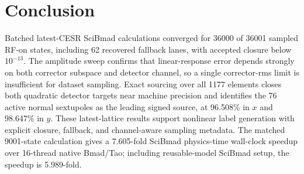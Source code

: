 \documentclass[letterpaper]{jacow}
\begin{document}
\section{Conclusion}

Batched latest-CESR SciBmad calculations converged for 36000 of 36001 sampled
RF-on states, including 62 recovered fallback lanes, with accepted closure
below $10^{-13}$. The amplitude sweep confirms that linear-response error
depends strongly on both corrector subspace and detector channel, so a single
corrector-rms limit is insufficient for dataset sampling. Exact sourcing over
all 1177 elements closes both quadratic detector targets near machine
precision and identifies the 76 active normal sextupoles as the leading signed
source, at 96.508\% in $x$ and 98.647\% in $y$. These latest-lattice results
support nonlinear label generation with explicit closure, fallback, and
channel-aware sampling metadata. The matched 9001-state calculation gives a
7.605-fold SciBmad physics-time wall-clock speedup over 16-thread native
Bmad/Tao; including reusable-model SciBmad setup, the speedup is 5.989-fold.

\clearpage
\end{document}
